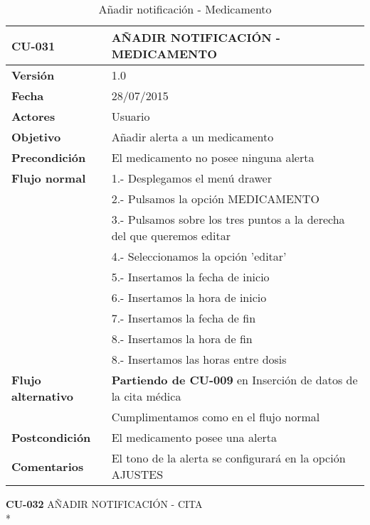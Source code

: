 \documentclass[../pfc.tex]{subfiles}
\begin{document}
	\begin{table}[H]
		\centering
		\begin{tabular}[t]{|p{3cm}|p{9.5cm}|}
			\hline \textbf{CU-031} & \textbf{AÑADIR NOTIFICACIÓN - MEDICAMENTO} \\*
			\hline\hline \textbf{Versión} & 1.0 \\*
			\hline\hline \textbf{Fecha} & 28/07/2015 \\*
			\hline\textbf{Actores} 	& Usuario\\*
			\hline \textbf{Objetivo} & Añadir alerta a un medicamento\\* 			
			\hline \textbf{Precondición} & El medicamento no posee ninguna alerta\\* 
			\hline \textbf{Flujo normal} & 1.- Desplegamos el menú drawer \\* 
			& 2.- Pulsamos la opción MEDICAMENTO\\*	
			& 3.- Pulsamos sobre los tres puntos a la derecha del que queremos editar\\*	
			& 4.- Seleccionamos la opción 'editar'\\*	
			& 5.- Insertamos la fecha de inicio\\*
			& 6.- Insertamos la hora de inicio\\*
			& 7.- Insertamos la fecha de fin\\*
			& 8.- Insertamos la hora de fin\\*
			& 8.- Insertamos las horas entre dosis\\*
			\hline \textbf{Flujo alternativo} & \textbf{Partiendo de CU-009} en Inserción de datos de la cita médica\\*  
			& Cumplimentamos como en el flujo normal\\*
			\hline \textbf{Postcondición} & El medicamento posee una alerta\\* 
			\hline \textbf{Comentarios}   & El tono de la alerta se configurará en la opción AJUSTES\\*
			\hline
		\end{tabular}
		\caption{Añadir notificación - Medicamento}
		\label{tabla:caso031}
	\end{table}		

	\textbf{CU-032}	AÑADIR NOTIFICACIÓN - CITA\\*
	
\end{document}
